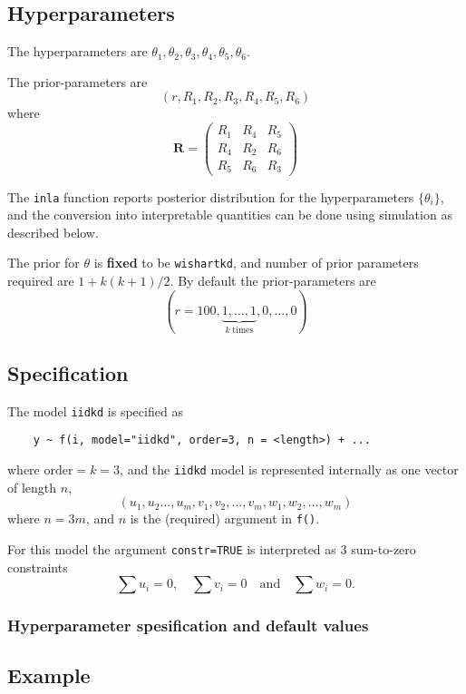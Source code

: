 \documentclass[a4paper,11pt]{article}
\begin{document}
\subsection*{Hyperparameters}

The hyperparameters are
$\theta_1, \theta_2, \theta_3, \theta_4, \theta_5, \theta_6$.

The prior-parameters are
\begin{displaymath}
    (r,R_{1}, R_{2}, R_{3}, R_{4}, R_{5}, R_{6})
\end{displaymath}
where 
\begin{displaymath}
    \mathbf{R}= \left(
      \begin{array}{ccc}
        R_{1} & R_{4} & R_{5}\\
        R_{4} & R_{2} & R_{6} \\
        R_{5} & R_{6} & R_{3}
      \end{array}\right)
\end{displaymath}

The {\tt inla} function reports posterior distribution for the
hyperparameters $\{\theta_i\}$, and the conversion into interpretable
quantities can be done using simulation as described below.

The prior for $\theta$ is {\bf fixed} to be {\tt wishartkd}, and
number of prior parameters required are $1 + k(k+1)/2$. By default the
prior-parameters are
\begin{displaymath}
    (r=100, \underbrace{1, \ldots, 1}_{k\;\text{times}}, 0, \ldots, 0)
\end{displaymath}


\subsection*{Specification}

The model \texttt{iidkd}
is specified as
\begin{verbatim}
    y ~ f(i, model="iidkd", order=3, n = <length>) + ...
\end{verbatim}
where $\text{order}=k=3$, and the \texttt{iidkd} model is represented
internally as one vector of length $n$,
\begin{displaymath}
    (u_{1}, u_{2} \ldots, u_{m}, v_{1}, v_{2}, \ldots, v_{m}, w_{1},
    w_{2}, \ldots, w_{m})
\end{displaymath}
where $n = 3m$, and $n$ is the (required) argument in
\texttt{f()}.

For this model the argument \texttt{constr=TRUE} is interpreted as $3$
sum-to-zero constraints
\begin{displaymath}
    \sum u_{i} = 0, \quad \sum v_{i} = 0 \quad\text{and}\quad \sum w_{i} = 0.
\end{displaymath}

\subsubsection*{Hyperparameter spesification and default values}



\subsection*{Example}
\begin{verbatim}
\end{verbatim}
\end{document}
